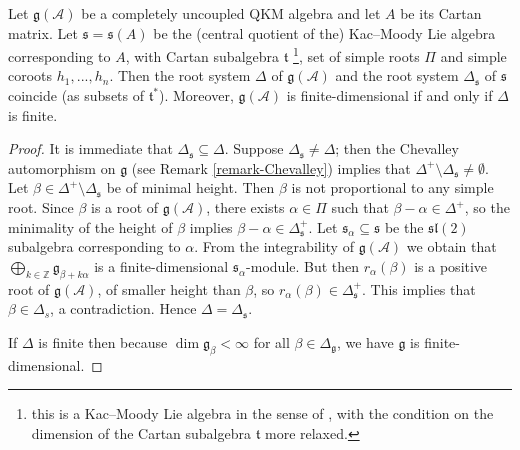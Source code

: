 \documentclass[12pt, a4paper, reqno]{amsart}
\def\l{\mathfrak{l}}
\def\s{\mathfrak{s}}
\theoremstyle{definition}
\theoremstyle{definition}
\theoremstyle{definition}
\numberwithin{theorem}{section}
\numberwithin{lemma}{section}
\numberwithin{remark}{section}
\numberwithin{definition}{section}
\numberwithin{corollary}{section}
\numberwithin{proposition}{section}
\numberwithin{example}{section}
\begin{document}
	\begin{theorem}\label{theorem-root-system}
		Let \(\mathfrak{g}(\mathcal{A})\) be a completely uncoupled QKM algebra and let \(A\) be its Cartan matrix. Let \(\mathfrak{s} = \mathfrak{s}(A)\) be the (central quotient of the) Kac--Moody Lie algebra corresponding to \(A\), with Cartan subalgebra \(\mathfrak{t}\) \footnote{this is a Kac--Moody Lie algebra in the sense of \cite{GHS}, with the condition on the dimension of the Cartan subalgebra \(\mathfrak{t}\) more relaxed.}, set of simple roots \(\Pi\) and simple coroots \(h_1,...,h_n\). Then the root system \(\Delta\) of \(\mathfrak{g}(\mathcal{A})\) and the root system \(\Delta_{\mathfrak{s}}\) of \(\mathfrak{s}\) coincide (as subsets of \(\mathfrak{t}^*\)). Moreover, \(\mathfrak{g}(\mathcal{A})\) is finite-dimensional if and only if \(\Delta\) is finite.
	\end{theorem}
	\begin{proof}
		It is immediate that \(\Delta_\mathfrak{s} \subseteq \Delta\). Suppose \(\Delta_\mathfrak{s} \neq \Delta\); then the Chevalley automorphism on \(\mathfrak{g}\) (see Remark \ref{remark-Chevalley}) implies that \(\Delta^+ \setminus \Delta_{\mathfrak{s}} \neq \emptyset\). Let \(\beta \in \Delta^+ \setminus \Delta_{\mathfrak{s}}\) be of minimal height. Then \(\beta\) is not proportional to any simple root. Since \(\beta\) is a root of \(\mathfrak{g}(\mathcal{A})\), there exists \(\alpha \in \Pi\) such that \(\beta - \alpha \in \Delta^+\), so the minimality of the height of \(\beta\) implies \(\beta - \alpha \in \Delta_\mathfrak{s}^+\). Let \(\mathfrak{s_{\alpha}} \subseteq \mathfrak{s}\) be the \(\s\l(2)\) subalgebra corresponding to \(\alpha\). From the integrability of \(\mathfrak{g}(\mathcal{A})\) we obtain that \(\bigoplus_{k\in\mathbb{Z}} \mathfrak{g}_{\beta + k \alpha}\) is a finite-dimensional \(\mathfrak{s}_{\alpha}\)-module. But then \(r_{\alpha}(\beta)\) is a positive root of \(\mathfrak{g(\mathcal{A})}\), of smaller height than \(\beta\), so \(r_{\alpha}(\beta) \in \Delta_{\mathfrak{s}}^+\). This implies that \(\beta \in \Delta_{s}\), a contradiction. Hence \(\Delta = \Delta_{\mathfrak{s}}\). \par

		If \(\Delta\) is finite then because \(\dim \mathfrak{g}_{\beta}<\infty\) for all \(\beta \in \Delta_\mathfrak{g}\), we have \(\mathfrak{g}\) is finite-dimensional.
	\end{proof}
	
\end{document}
